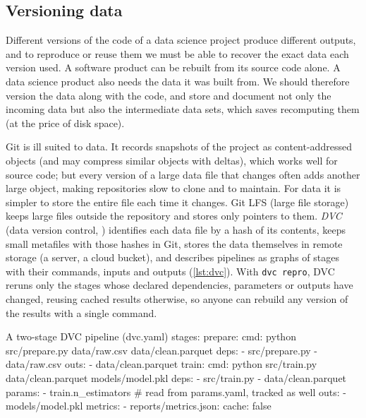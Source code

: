 \subsection{Versioning data}

Different versions of the code of a data science project produce different outputs, and to reproduce
or reuse them we must be able to recover the exact data each version used. A software product can be
rebuilt from its source code alone. A data science product also needs the data it was built from. We should therefore version the data
along with the code, and store and document not only the incoming data but also the intermediate data
sets, which saves recomputing them (at the price of disk space).

Git is ill suited to data. It records snapshots of the project as content-addressed objects (and may compress
similar objects with deltas), which works well for source code; but every version of a large data file that
changes often adds another large object, making repositories slow to clone and to maintain. For data it is simpler to store the entire file each time it changes. Git LFS (large file storage)
keeps large files outside the repository and stores only pointers to them. \emph{DVC} (data version
control, \citealp{dvc2024}) identifies each data file by a hash of its contents, keeps
small metafiles with those hashes in Git, stores the data themselves in remote storage (a server, a
cloud bucket), and describes pipelines as graphs of stages with their commands, inputs and outputs
(\cref{lst:dvc}). With \texttt{dvc repro}, DVC reruns only the stages whose declared dependencies, parameters or outputs have
changed, reusing cached results otherwise, so
anyone can rebuild any version of the results with a single command.

\begin{pylisting}[label={lst:dvc},listing options={style=outstyle}]{A two-stage DVC pipeline (dvc.yaml)}
stages:
  prepare:
    cmd: python src/prepare.py data/raw.csv data/clean.parquet
    deps:
      - src/prepare.py
      - data/raw.csv
    outs:
      - data/clean.parquet
  train:
    cmd: python src/train.py data/clean.parquet models/model.pkl
    deps:
      - src/train.py
      - data/clean.parquet
    params:
      - train.n_estimators          # read from params.yaml, tracked as well
    outs:
      - models/model.pkl
    metrics:
      - reports/metrics.json:
          cache: false
\end{pylisting}

